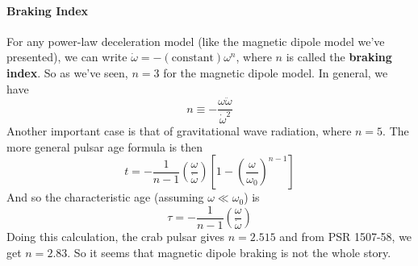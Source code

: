 \documentclass[10pt]{article}
\numberwithin{equation}{section}
\begin{document}
	\paragraph{Braking Index} %
	\label{par:braking_index}
	For any power-law deceleration model (like the magnetic dipole model we've presented), we can write $\dot{\omega} = - (\mathrm{constant})\omega^n$, where $n$ is called the \textbf{braking index}. So as we've seen, $n=3$ for the magnetic dipole model. In general, we have\\
	\begin{equation}
		\label{eq:spindown:11} n \equiv -\frac{\omega\ddot{\omega}}{\dot{\omega}^2}
	\end{equation}
	Another important case is that of gravitational wave radiation, where $n=5$. The more general pulsar age formula is then
	\begin{equation}
		\label{eq:spindown:12} t = -\frac{1}{n-1} \left(\frac{\omega}{\dot{\omega}}\right) \left[1-\left( \frac{\omega}{\omega_0}\right)^{n-1}\right]
	\end{equation}
	And so the characteristic age (assuming $\omega \ll \omega_0$) is 
	\begin{equation}
		\label{eq:spindown:13} \tau = -\frac{1}{n-1}\left(\frac{\omega}{\dot{\omega}}\right)
	\end{equation}
	Doing this calculation, the crab pulsar gives $n=2.515$ and from PSR 1507-58, we get $n=2.83$. So it seems that magnetic dipole braking is not the whole story.
\end{document}
